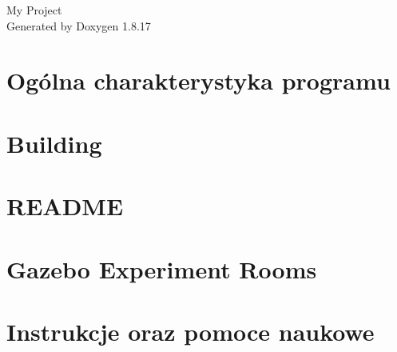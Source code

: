 \let\mypdfximage\pdfximage\def\pdfximage{\immediate\mypdfximage}\documentclass[twoside]{book}
\newcommand{\+}{\discretionary{\mbox{\scriptsize$\hookleftarrow$}}{}{}}
\newcommand{\clearemptydoublepage}{%
  \newpage{\pagestyle{empty}\cleardoublepage}%
}
\begin{document}
\hypersetup{pageanchor=false,
             bookmarksnumbered=true,
             pdfencoding=unicode
            }
\begin{titlepage}
\vspace*{7cm}
\begin{center}%
{\Large My Project }\\
\vspace*{1cm}
{\large Generated by Doxygen 1.8.17}\\
\end{center}
\end{titlepage}
\clearemptydoublepage
{}
\tableofcontents
\clearemptydoublepage
{}
\hypersetup{pageanchor=true}

\chapter{Ogólna charakterystyka programu}
\label{index}\hypertarget{index}{}
\chapter{Building}
\label{md__home_patryk__pulpit_zad4-_patidzon__r_e_a_d_m_e}

\chapter{R\+E\+A\+D\+ME}
\label{md__home_patryk__pulpit_zad4-_patidzon_tests_bin_queue_8pyi_models_piston_rod_part_ariac__r_e_a_d_m_e}

\chapter{Gazebo Experiment Rooms}
\label{md__home_patryk__pulpit_zad4-_patidzon_tests_doctest_extensions_synchronize_8pyi__r_e_a_d_m_e}

\chapter{Instrukcje oraz pomoce naukowe}
\label{md__home_patryk__pulpit_zad4-_patidzon_tests_doctest_translation_8pyi_social-tracking-protection2b879499cc84c6c38254f8f940fff3c0}

\end{document}
